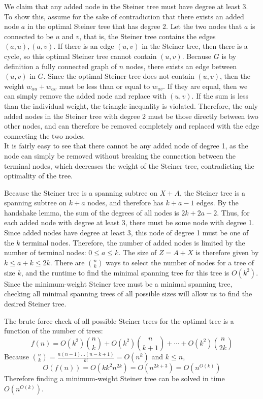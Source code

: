 \documentclass[oneside, 12pt]{article}
\begin{document}
\begin{enumerate}
We claim that any added node in the Steiner tree must have degree at least 3. \\
To show this, assume for the sake of contradiction that there exists an added node $a$ in the optimal Steiner tree that has degree 2. Let the two nodes that $a$ is connected to be $u$ and $v$, that is, the Steiner tree contains the edges $(a, u), (a, v)$. If there is an edge $(u, v)$ in the Steiner tree, then there is a cycle, so this optimal Steiner tree cannot contain $(u, v)$. Because $G$ is by definition a fully connected graph of $n$ nodes, there exists an edge between $(u, v)$ in $G$. Since the optimal Steiner tree does not contain $(u, v)$, then the weight $w_{au} + w_{av}$ must be less than or equal to $w_{uv}$. If they are equal, then we can simply remove the added node and replace with $(u, v)$. If the sum is less than the individual weight, the triangle inequality is violated. Therefore, the only added nodes in the Steiner tree with degree 2 must be those directly between two other nodes, and can therefore be removed completely and replaced with the edge connecting the two nodes. \\
It is fairly easy to see that there cannot be any added node of degree 1, as the node can simply be removed without breaking the connection between the terminal nodes, which decreases the weight of the Steiner tree, contradicting the optimality of the tree. 

Because the Steiner tree is a spanning subtree on $X + A$, the Steiner tree is a spanning subtree on $k + a$ nodes, and therefore has $k + a - 1$ edges. By the handshake lemma, the sum of the degrees of all nodes is $2k + 2a - 2$. Thus, for each added node with degree at least 3, there must be some node with degree 1. Since added nodes have degree at least 3, this node of degree 1 must be one of the $k$ terminal nodes. Therefore, the number of added nodes is limited by the number of terminal nodes: $0 \le a \le k$. The size of $Z = A + X$ is therefore given by $k \le a + k \le 2k$. There are ${n \choose k}$ ways to select the number of nodes for a tree of size $k$, and the runtime to find the minimal spanning tree for this tree is $O(k^2)$. Since the minimum-weight Steiner tree must be a minimal spanning tree, checking all minimal spanning trees of all possible sizes will allow us to find the desired Steiner tree. 

The brute force check of all possible Steiner trees for the optimal tree is a function of the number of trees: 
\[
f(n) = O(k^2){n \choose k} + O(k^2){n \choose k + 1} + \cdots + O(k^2){n \choose 2k}
\]
Because ${n \choose k} = \frac{n(n-1)...(n-k+1)}{k!} = O(n^k)$ and $k \le n$,
\[
O(f(n)) = O(k k^2 n^{2k}) = O(n^{2k + 3}) = O(n^{O(k)})
\]
Therefore finding a minimum-weight Steiner tree can be solved in time $O(n^{O(k)})$.
\end{enumerate}
\end{document}
